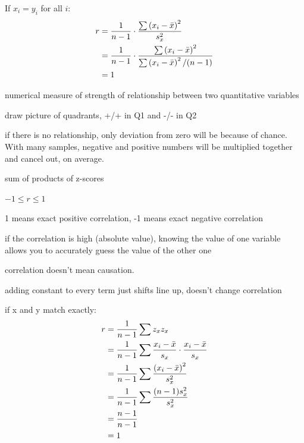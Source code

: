 \documentclass[landscape]{exam}
\begin{document}
  If $x_i = y_i$ for all $i$:
  \begin{align*}
    r & = \frac{1}{n - 1} \cdot \frac{\sum \del{x_i - \bar{x}}^2}{s_x^2} \\
      & = \frac{1}{n - 1} \cdot \frac{\sum \del{x_i - \bar{x}}^2}
                                     {\sum \del{x_i - \bar{x}}^2/(n - 1)} \\
      &= 1 \\
  \end{align*}

  \begin{itemize*}
    \item numerical measure of strength of relationship between two quantitative
      variables

    \item draw picture of quadrants, +/+ in Q1 and -/- in Q2

    \item if there is no relationship, only deviation from zero will be because
      of chance. With many samples, negative and positive numbers will be
      multiplied together and cancel out, on average.

    \item sum of products of z-scores

    \item $-1 \leq r \leq 1$

    \item 1 means exact positive correlation, -1 means exact negative
      correlation

    \item if the correlation is high (absolute value), knowing the value of
      one variable allows you to accurately guess the value of the
      other one

    \item correlation doesn't mean causation.  

    \item adding constant to every term just shifts line up, doesn't change
      correlation

  \end{itemize*}

  if x and y match exactly:
  \begin{align*}
    r & = \frac{1}{n - 1} \sum z_x z_x \\
      & = \frac{1}{n - 1} \sum \frac{x_i - \bar{x}}{s_x} \cdot \frac{x_i - \bar{x}}{s_x} \\
      & = \frac{1}{n - 1} \sum \frac{\del{ x_i - \bar{x} }^2}{s_x^2} \\
      & = \frac{1}{n - 1} \sum \frac{(n - 1) s_x^2}{s_x^2} \\
      & = \frac{n - 1}{n - 1} \\
      & = 1 \\
  \end{align*}
\end{document}
